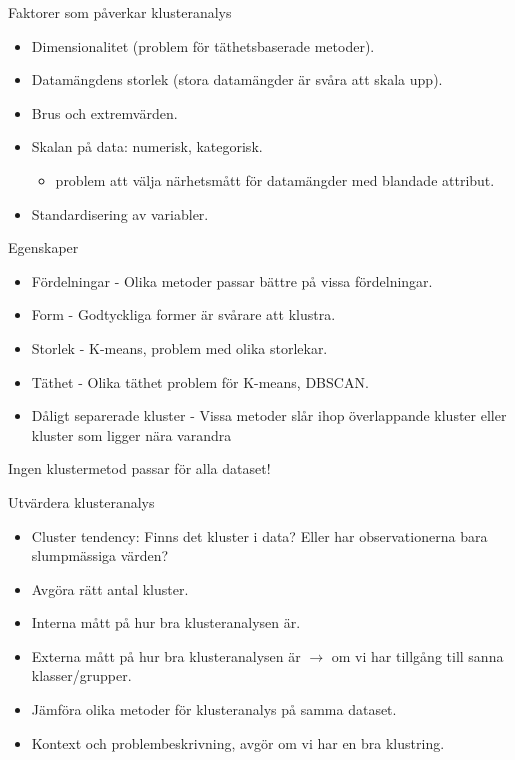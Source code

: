\documentclass[10pt,english]{beamer}
\begin{document}
\begin{frame}{Faktorer som påverkar klusteranalys}
    \begin{itemize}
        \item Dimensionalitet (problem för täthetsbaserade metoder).
        \item Datamängdens storlek (stora datamängder är svåra att skala upp).
        \item Brus och extremvärden.
        \item Skalan på data: numerisk, kategorisk.
        \begin{itemize}
            \item problem att välja närhetsmått för datamängder med blandade attribut.
        \end{itemize}
        \item Standardisering av variabler.
    \end{itemize}
\end{frame}

\begin{frame}{Egenskaper}
    
\begin{itemize}
    \item Fördelningar - Olika metoder passar bättre på vissa fördelningar.
    \item Form - Godtyckliga former är svårare att klustra.
    \item Storlek - K-means, problem med olika storlekar.
    \item Täthet - Olika täthet problem för K-means, DBSCAN.
    \item Dåligt separerade kluster - Vissa metoder slår ihop överlappande kluster eller kluster som ligger nära varandra
\end{itemize}

\begin{redbox}
Ingen klustermetod passar för alla dataset!
\end{redbox}

\end{frame}

\begin{frame}{Utvärdera klusteranalys}

    \begin{itemize}
        \item Cluster tendency: Finns det kluster i data? Eller har observationerna bara slumpmässiga värden?
        \item Avgöra rätt antal kluster.
        \item Interna mått på hur bra klusteranalysen är.
        \item Externa mått på hur bra klusteranalysen är $\rightarrow$ om vi har tillgång till sanna klasser/grupper.
        \item Jämföra olika metoder för klusteranalys på samma dataset.
        \item Kontext och problembeskrivning, avgör om vi har en bra klustring.
    \end{itemize}
    
\end{frame}
\end{document}
